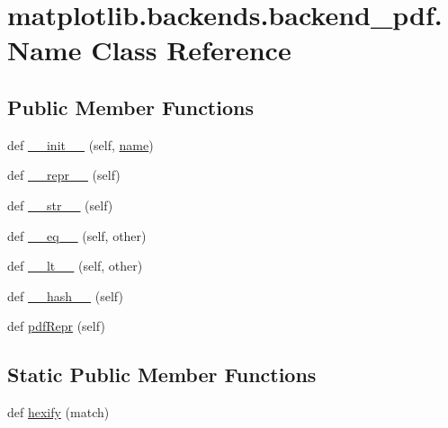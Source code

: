 \hypertarget{classmatplotlib_1_1backends_1_1backend__pdf_1_1Name}{}\section{matplotlib.\+backends.\+backend\+\_\+pdf.\+Name Class Reference}
\label{classmatplotlib_1_1backends_1_1backend__pdf_1_1Name}
\subsection*{Public Member Functions}
\begin{DoxyCompactItemize}
\item 
def \hyperlink{classmatplotlib_1_1backends_1_1backend__pdf_1_1Name_a8795c18f40af03dcba15f3bb2bc334d8}{\+\_\+\+\_\+init\+\_\+\+\_\+} (self, \hyperlink{classmatplotlib_1_1backends_1_1backend__pdf_1_1Name_a0a02ac6ff39a6e16b4248faa9ddbf884}{name})
\item 
def \hyperlink{classmatplotlib_1_1backends_1_1backend__pdf_1_1Name_aa1ee1aa6ecc2036b1a7b77b051c13d51}{\+\_\+\+\_\+repr\+\_\+\+\_\+} (self)
\item 
def \hyperlink{classmatplotlib_1_1backends_1_1backend__pdf_1_1Name_a21313e3657bc4b610ae22816daba40db}{\+\_\+\+\_\+str\+\_\+\+\_\+} (self)
\item 
def \hyperlink{classmatplotlib_1_1backends_1_1backend__pdf_1_1Name_ad2dcad7f5f5c336a637467d0be984b75}{\+\_\+\+\_\+eq\+\_\+\+\_\+} (self, other)
\item 
def \hyperlink{classmatplotlib_1_1backends_1_1backend__pdf_1_1Name_a7ce05d9e9bf475bcb11d4e347611333a}{\+\_\+\+\_\+lt\+\_\+\+\_\+} (self, other)
\item 
def \hyperlink{classmatplotlib_1_1backends_1_1backend__pdf_1_1Name_ad8e88517c7d1bf6910eda8ce6190dfb7}{\+\_\+\+\_\+hash\+\_\+\+\_\+} (self)
\item 
def \hyperlink{classmatplotlib_1_1backends_1_1backend__pdf_1_1Name_aeb7d4b039879746b9d1ef2f0f17f9abf}{pdf\+Repr} (self)
\end{DoxyCompactItemize}
\subsection*{Static Public Member Functions}
\begin{DoxyCompactItemize}
\item 
def \hyperlink{classmatplotlib_1_1backends_1_1backend__pdf_1_1Name_ad0533ab594d3406b3d5bbce5ef7f9b52}{hexify} (match)
\end{DoxyCompactItemize}
